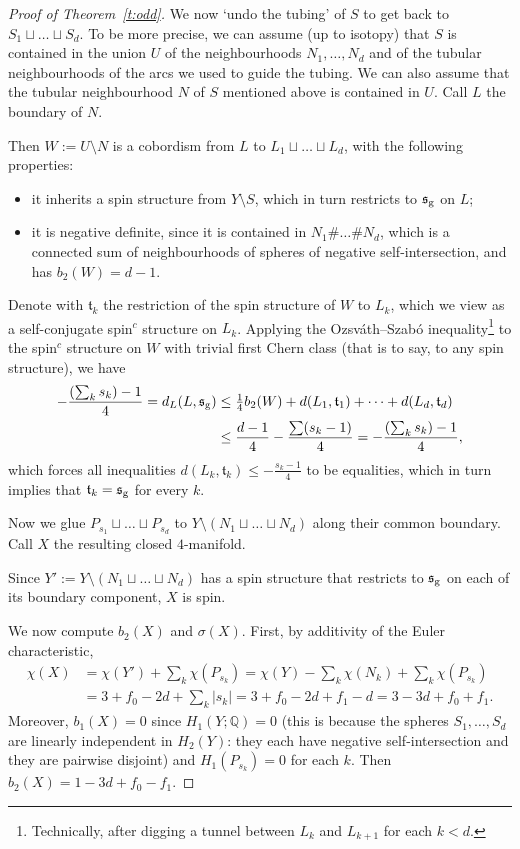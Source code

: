 \documentclass[a4paper,12pt, onesided]{amsart}
\theoremstyle{remark}
\numberwithin{figure}{section}
\numberwithin{equation}{section}
\newcommand{\Q}{\mathbb{Q}}
\newcommand{\fs}{\mathfrak{s}}
\newcommand{\ft}{\mathfrak{t}}
\begin{document}
\begin{proof}[Proof of Theorem~\ref{t:odd}]
We now `undo the tubing' of $S$ to get back to $S_1 \sqcup \dots \sqcup S_d$.
To be more precise, we can assume (up to isotopy) that $S$ is contained in the union $U$ of the neighbourhoods $N_1, \dots, N_d$ and of the tubular neighbourhoods of the arcs we used to guide the tubing.
We can also assume that the tubular neighbourhood $N$ of $S$ mentioned above is contained in $U$.
Call $L$ the boundary of $N$.

Then $W := U\setminus N$ is a cobordism from $L$ to $L_1 \sqcup \dots \sqcup L_d$, with the following properties:
\begin{itemize}
\item it inherits a spin structure from $Y\setminus S$, which in turn restricts to $\fs_{\rm g}$ on $L$;
\item it is negative definite, since it is contained in $N_1 \# \dots \# N_d$, which is a connected sum of neighbourhoods of spheres of negative self-intersection, and has $b_2(W) = d-1$.
\end{itemize}
Denote with $\ft_k$ the restriction of the spin structure of $W$ to $L_k$, which we view as a self-conjugate spin$^c$ structure on $L_k$.
Applying the Ozsv\'ath--Szab\'o inequality\footnote{Technically, after digging a tunnel between $L_k$ and $L_{k+1}$ for each $k < d$.} to the spin$^c$ structure on $W$ with trivial first Chern class (that is to say, to any spin structure), we have
\begin{align*}
-\frac{(\sum_k s_k)-1}4 = d_L(L,\fs_{\rm g}) &\le {\textstyle \frac14}b_2(W) + d(L_1,\ft_1) + \dots + d(L_d,\ft_d) \\
&\le \frac{d-1}4 - \frac{\sum (s_k-1)}4 = -\frac{(\sum_k s_k)-1}4,
\end{align*}
which forces all inequalities $d(L_k,\ft_k) \le -\frac{s_k-1}4$ to be equalities, which in turn implies that $\ft_k = \fs_{\rm g}$ for every $k$.

Now we glue $P_{s_1}\sqcup \dots \sqcup P_{s_d}$ to $Y \setminus (N_1 \sqcup \dots \sqcup N_d)$ along their common boundary.
Call $X$ the resulting closed $4$-manifold.

Since $Y' := Y \setminus (N_1 \sqcup \dots \sqcup N_d)$ has a spin structure that restricts to $\fs_{\rm g}$ on each of its boundary component, $X$ is spin.

We now compute $b_2(X)$ and $\sigma(X)$.
First, by additivity of the Euler characteristic,
\begin{align*}
\chi(X) &= \chi(Y') + \sum_k \chi(P_{s_k}) = \chi(Y) - \sum_k \chi(N_k) + \sum_k \chi(P_{s_k})\\
& = 3 + f_0 - 2d + \sum_k |s_k| = 3 + f_0 - 2d + f_1 - d = 3-3d+f_0+f_1.
\end{align*}
Moreover, $b_1(X) = 0$ since $H_1(Y;\Q) = 0$ (this is because the spheres $S_1, \dots, S_d$ are linearly independent in $H_2(Y)$: they each have negative self-intersection and they are pairwise disjoint) and $H_1(P_{s_k}) = 0$ for each $k$.
Then $b_2(X) = 1-3d+f_0-f_1$.


\end{proof}
\end{document}
